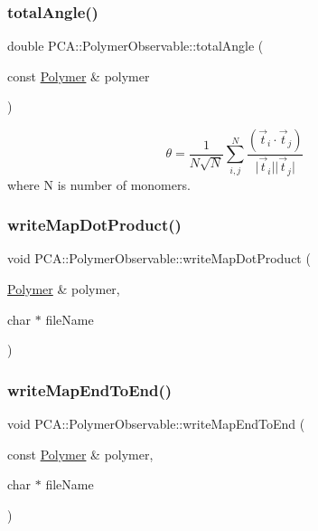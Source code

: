 \subsubsection{\texorpdfstring{total\+Angle()}{totalAngle()}}
{\footnotesize\ttfamily double P\+C\+A\+::\+Polymer\+Observable\+::total\+Angle (\begin{DoxyParamCaption}\item[{const \hyperlink{class_p_c_a_1_1_polymer}{Polymer} \&}]{polymer }\end{DoxyParamCaption})\hspace{0.3cm}{\ttfamily [static]}}





\[ \theta = \frac{1}{N\sqrt {N}} \sum_{i,j}^N \frac{(\vec{t}_i\cdot \vec{t}_j)}{\vert\vec{t}_i\vert\vert\vec{t}_j\vert} \] where N is number of monomers. \hypertarget{class_p_c_a_1_1_polymer_observable_aa41850ca819c76bdceeb644e0a570c46}{}\label{class_p_c_a_1_1_polymer_observable_aa41850ca819c76bdceeb644e0a570c46} 
\subsubsection{\texorpdfstring{write\+Map\+Dot\+Product()}{writeMapDotProduct()}}
{\footnotesize\ttfamily void P\+C\+A\+::\+Polymer\+Observable\+::write\+Map\+Dot\+Product (\begin{DoxyParamCaption}\item[{\hyperlink{class_p_c_a_1_1_polymer}{Polymer} \&}]{polymer,  }\item[{char $\ast$}]{file\+Name }\end{DoxyParamCaption})\hspace{0.3cm}{\ttfamily [static]}}

\hypertarget{class_p_c_a_1_1_polymer_observable_ac63e1b37da93eca84e21916f01279a59}{}\label{class_p_c_a_1_1_polymer_observable_ac63e1b37da93eca84e21916f01279a59} 
\subsubsection{\texorpdfstring{write\+Map\+End\+To\+End()}{writeMapEndToEnd()}}
{\footnotesize\ttfamily void P\+C\+A\+::\+Polymer\+Observable\+::write\+Map\+End\+To\+End (\begin{DoxyParamCaption}\item[{const \hyperlink{class_p_c_a_1_1_polymer}{Polymer} \&}]{polymer,  }\item[{char $\ast$}]{file\+Name }\end{DoxyParamCaption})\hspace{0.3cm}{\ttfamily [static]}}



